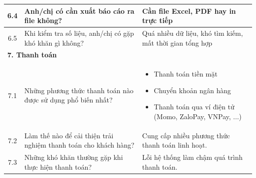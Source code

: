\documentclass[a4paper,12pt]{report}
\begin{document}
\begin{longtable}{|c|p{8cm}|p{7cm}|}
    \hline
    6.4          & Anh/chị có cần xuất báo cáo ra file không?                                                                              & Cần file Excel, PDF hay in trực tiếp                                                                                    \\
    \hline
    6.5          & Khi kiểm tra số liệu, anh/chị có gặp khó khăn gì không?                                                                 & Quá nhiều dữ liệu, khó tìm kiếm, mất thời gian tổng hợp                                                                 \\
    \hline
    \multicolumn{3}{|l|}{\textbf{7. Thanh toán}}                                                                                                                                                                                                                      \\
    \hline
    7.1          & Những phương thức thanh toán nào được sử dụng phổ biến nhất?                                                            &
    \begin{itemize}
        \item Thanh toán tiền mặt
        \item Chuyển khoản ngân hàng
        \item Thanh toán qua ví điện tử (Momo, ZaloPay, VNPay, ...)
    \end{itemize}                                                                                                                                                                                                        \\
    \hline
    7.2          & Làm thế nào để cải thiện trải nghiệm thanh toán cho khách hàng?                                                         & Cung cấp nhiều phương thức thanh toán linh hoạt.                                                                         \\
    \hline
    7.3          & Những khó khăn thường gặp khi thực hiện thanh toán?                                                                     & Lỗi hệ thống làm chậm quá trình thanh toán.                                                                              \\
    \hline
\end{longtable}
\end{document}
